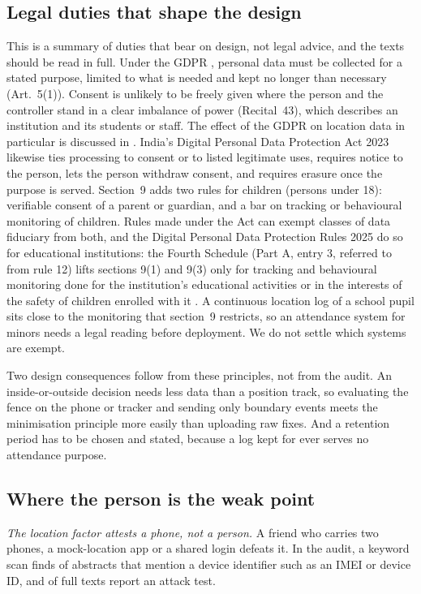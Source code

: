 \documentclass[preprint,12pt]{elsarticle}
\begin{document}
\subsection{Legal duties that shape the design}
This is a summary of duties that bear on design, not legal advice, and the texts should be read in full. Under the GDPR \cite{gdpr2016}, personal data must be collected for a stated purpose, limited to what is needed and kept no longer than necessary (Art.~5(1)). Consent is unlikely to be freely given where the person and the controller stand in a clear imbalance of power (Recital~43), which describes an institution and its students or staff. The effect of the GDPR on location data in particular is discussed in \cite{georgiadou2019location}. India's Digital Personal Data Protection Act 2023 \cite{dpdp2023} likewise ties processing to consent or to listed legitimate uses, requires notice to the person, lets the person withdraw consent, and requires erasure once the purpose is served. Section~9 adds two rules for children (persons under 18): verifiable consent of a parent or guardian, and a bar on tracking or behavioural monitoring of children. Rules made under the Act can exempt classes of data fiduciary from both, and the Digital Personal Data Protection Rules 2025 do so for educational institutions: the Fourth Schedule (Part A, entry 3, referred to from rule 12) lifts sections 9(1) and 9(3) only for tracking and behavioural monitoring done for the institution's educational activities or in the interests of the safety of children enrolled with it \cite{dpdp2025rules}. A continuous location log of a school pupil sits close to the monitoring that section~9 restricts, so an attendance system for minors needs a legal reading before deployment. We do not settle which systems are exempt.

Two design consequences follow from these principles, not from the audit. An inside-or-outside decision needs less data than a position track, so evaluating the fence on the phone or tracker and sending only boundary events meets the minimisation principle more easily than uploading raw fixes. And a retention period has to be chosen and stated, because a log kept for ever serves no attendance purpose.

\subsection{Where the person is the weak point}
\emph{The location factor attests a phone, not a person.} A friend who carries two phones, a mock-location app or a shared login defeats it. In the audit, a keyword scan finds \hfDevBind{} of \hfN{} abstracts that mention a device identifier such as an IMEI or device ID, and \ftQthree{} of \ftN{} full texts report an attack test.
\end{document}
